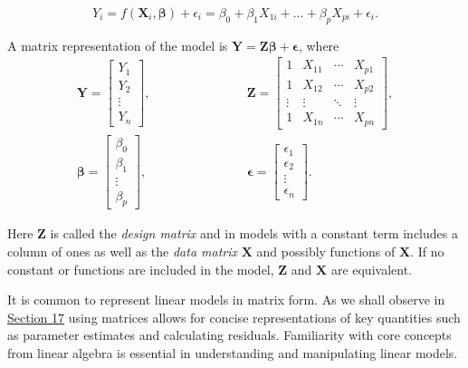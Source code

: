 \documentclass[
]{book}
\begin{document}
\[Y_i = f(\mathbf{X}_i,\mathbf{\beta}) + \epsilon_i = \beta_0 + \beta_1X_{1i} + \dots + \beta_p X_{pi} + \epsilon_i.  \]

A matrix representation of the model is \(\mathbf{Y} = \mathbf{Z} \mathbf{\beta} + \mathbf{\epsilon}\), where\\

\begin{eqnarray*}  
\mathbf{Y} = \left[ \begin{array}{c} Y_1 \\ Y_2 \\ \vdots \\ Y_n \end{array} \right], &\qquad \qquad \qquad&
\mathbf{Z} = \left[ \begin{array}{cccc} 1 & X_{11} & \cdots & X_{p1} \\ 1 & X_{12} & \cdots & X_{p2} \\
\vdots & \vdots & \ddots & \vdots \\ 1 & X_{1n} & \cdots & X_{pn} \end{array} \right], \\
\mathbf{\beta} = \left[ \begin{array}{c} \beta_0 \\ \beta_1 \\ \vdots \\ \beta_p \end{array} \right], &\quad \qquad \qquad&
\mathbf{\epsilon} = \left[ \begin{array}{c} \epsilon_1 \\ \epsilon_2 \\ \vdots \\ \epsilon_n \end{array} \right].
\end{eqnarray*}

Here \(\mathbf{Z}\) is called the \emph{design matrix} and in models with a constant term includes a column of ones as well as the \emph{data matrix} \(\mathbf{X}\) and possibly functions of \(\mathbf{X}\). If no constant or functions are included in the model, \(\mathbf{Z}\) and \(\mathbf{X}\) are equivalent.

It is common to represent linear models in matrix form. As we shall observe in \protect\hyperlink{Sec_Linear_LSE}{Section 17} using matrices allows for concise representations of key quantities such as parameter estimates and calculating residuals. Familiarity with core concepts from linear algebra is essential in understanding and manipulating linear models.
\end{document}
